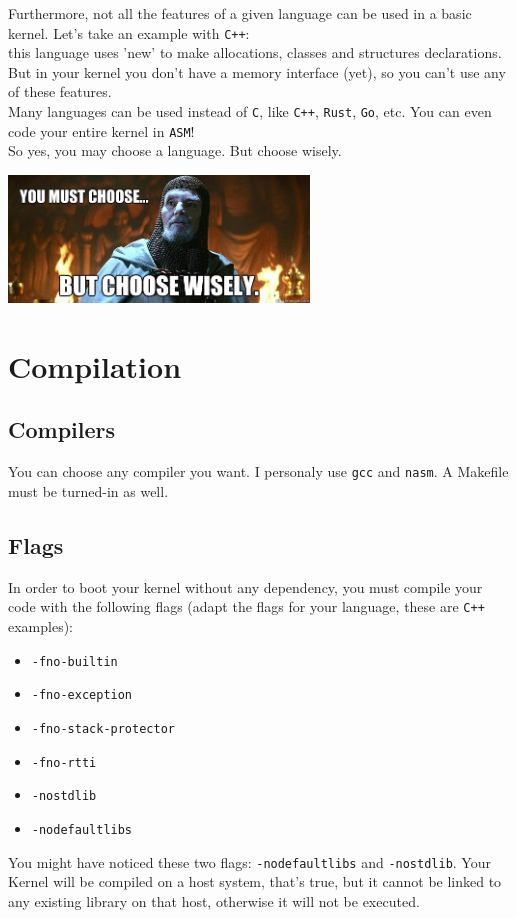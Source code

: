 \documentclass{42-en}
\begin{document}
            Furthermore, not all the features of a given language can be used
            in a basic kernel. Let's take an example with \texttt{C++}:\\
            this language uses 'new' to make allocations, classes and
            structures declarations. But in your kernel you don't have a memory
            interface (yet), so you can't use any of these features.\\

            Many languages can be used instead of \texttt{C},
            like \texttt{C++}, \texttt{Rust}, \texttt{Go}, etc.
            You can even code your entire kernel in \texttt{ASM}!\\
            So yes, you may choose a language. But choose wisely.
            \begin{center}
              \includegraphics[width=8cm]{choose.jpg}
            \end{center}
\newpage

    \section{Compilation}
        \subsection{Compilers}
            You can choose any compiler you want. I personaly use \texttt{gcc}
            and \texttt{nasm}. A Makefile must be turned-in as well.
        \subsection{Flags}
            In order to boot your kernel without any dependency, you must
            compile your code with the following flags (adapt the flags for
            your language, these are \texttt{C++} examples):
            \begin{itemize}\itemsep1pt
                \item \texttt{-fno-builtin}
                \item \texttt{-fno-exception}
                \item \texttt{-fno-stack-protector}
                \item \texttt{-fno-rtti}
                \item \texttt{-nostdlib}
                \item \texttt{-nodefaultlibs}
            \end{itemize}
            You might have noticed these two flags: \texttt{-nodefaultlibs}
            and \texttt{-nostdlib}. Your Kernel will be compiled on a host
            system, that's true, but it cannot be linked to any existing
            library on that host, otherwise it will not be executed.
\end{document}

